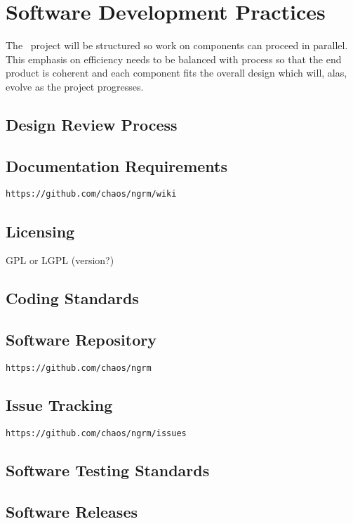 \section{Software Development Practices}\label{SWProcess}

The \ngrm\ project will be structured so work on components
can proceed in parallel.  This emphasis on efficiency needs to be
balanced with process so that the end product is coherent and each
component fits the overall design which will, alas, evolve as the
project progresses.

\subsection{Design Review Process}

\subsection{Documentation Requirements}
{\tt https://github.com/chaos/ngrm/wiki}

\subsection{Licensing}
GPL or LGPL (version?)

\subsection{Coding Standards}

\subsection{Software Repository}
{\tt https://github.com/chaos/ngrm}

\subsection{Issue Tracking}
{\tt https://github.com/chaos/ngrm/issues}

\subsection{Software Testing Standards}

\subsection{Software Releases}
